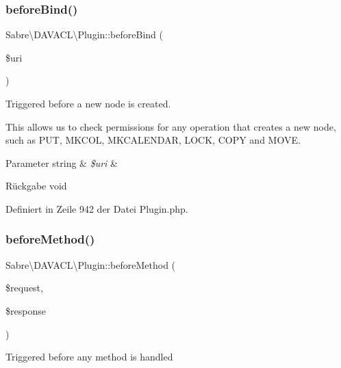\subsubsection{\texorpdfstring{before\+Bind()}{beforeBind()}}
{\footnotesize\ttfamily Sabre\textbackslash{}\+D\+A\+V\+A\+C\+L\textbackslash{}\+Plugin\+::before\+Bind (\begin{DoxyParamCaption}\item[{}]{\$uri }\end{DoxyParamCaption})}

Triggered before a new node is created.

This allows us to check permissions for any operation that creates a new node, such as P\+UT, M\+K\+C\+OL, M\+K\+C\+A\+L\+E\+N\+D\+AR, L\+O\+CK, C\+O\+PY and M\+O\+VE.


\begin{DoxyParams}[1]{Parameter}
string & {\em \$uri} & \\
\hline
\end{DoxyParams}
\begin{DoxyReturn}{Rückgabe}
void 
\end{DoxyReturn}


Definiert in Zeile 942 der Datei Plugin.\+php.

\mbox{\label{class_sabre_1_1_d_a_v_a_c_l_1_1_plugin_a7d29079839d48db4473122f2d08cbeed}} 
\subsubsection{\texorpdfstring{before\+Method()}{beforeMethod()}}
{\footnotesize\ttfamily Sabre\textbackslash{}\+D\+A\+V\+A\+C\+L\textbackslash{}\+Plugin\+::before\+Method (\begin{DoxyParamCaption}\item[{\mbox{\hyperlink{interface_sabre_1_1_h_t_t_p_1_1_request_interface}{Request\+Interface}}}]{\$request,  }\item[{\mbox{\hyperlink{interface_sabre_1_1_h_t_t_p_1_1_response_interface}{Response\+Interface}}}]{\$response }\end{DoxyParamCaption})}

Triggered before any method is handled


